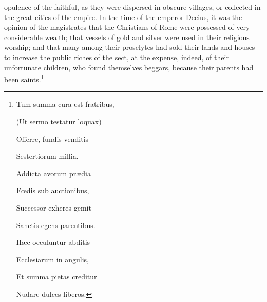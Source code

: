 opulence of the faithful, as they were dispersed in obscure villages, or collected in the great cities of the empire. In the time of the emperor Decius, it was the opinion of the magistrates that the Christians of Rome were possessed of very considerable wealth; that vessels of gold and silver were used in their religious worship; and that many among their proselytes had sold their lands and houses to increase the public riches of the sect, at the expense, indeed, of their unfortunate children, who found themselves beggars, because their parents had been saints.\footnote{Tum summa cura est fratribus,

(Ut sermo testatur loquax)

Offerre, fundis venditis

Sestertiorum millia.

Addicta avorum prædia

Fœdis sub auctionibus,

Successor exheres gemit

Sanctis egens parentibus.

Hæc occuluntur abditis

Ecclesiarum in angulis,

Et summa pietas creditur

Nudare dulces liberos.

}
